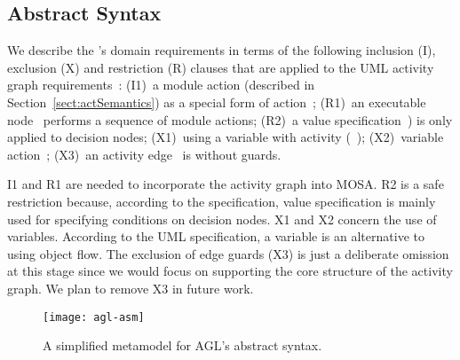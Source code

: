 \subsection{Abstract Syntax} 
\label{subsect:agl-abstractSyntax}

We describe the \agl's domain requirements in terms of the following inclusion (I), exclusion (X) and restriction (R) clauses that are applied to the UML activity graph requirements~\cite{omg_unified_2017}: (I1)~a module action (described in Section~\ref{sect:actSemantics}) as a special form of action~\cite[p.~442]{omg_unified_2017}; (R1)~an executable node~\cite[p.~403]{omg_unified_2017} performs a sequence of module actions; (R2)~a value specification~\cite[p.~374]{omg_unified_2017}) is only applied to decision nodes; (X1)~using a variable with activity (~\cite[p.~417]{omg_unified_2017}); (X2)~variable action~\cite[p.~467]{omg_unified_2017}; (X3)~an activity edge~\cite[p.~373]{omg_unified_2017} is without guards.

I1 and R1 are needed to incorporate the activity graph into MOSA. R2 is a safe restriction because, according to the specification, value specification is mainly used for specifying conditions on decision nodes. X1 and X2 concern the use of variables. According to the UML specification, a variable is an alternative to using object flow. The exclusion of edge guards (X3) is just a deliberate omission at this stage since we would focus on supporting the core structure of the activity graph. We plan to remove X3 in future work.
%
%
\begin{figure*}[ht]
	\vspace{-0.1cm}	
	\begin{center}
		\texttt{[image: agl-asm]}
	\end{center}
\vspace{-0.6cm}
	\caption{A simplified metamodel for AGL's abstract syntax.} %
	\label{fig:agl-abstractSyntax}
	\vspace{-0.2cm}
\end{figure*}

